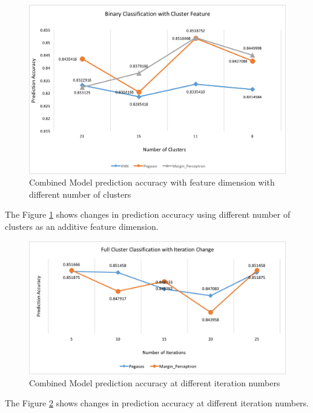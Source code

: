 \documentclass[11pt,letterpaper]{article}
\begin{document}
\begin{figure}
  \includegraphics[width=\linewidth]{5_binary_classificatoin_with_clusdter_feature.png}
  \caption{Combined Model prediction accuracy with feature dimension with different number of clusters}
  \label{fig:graph5}
\end{figure}

The Figure \ref{fig:graph5} shows changes in prediction accuracy using different number of clusters as an additive feature dimension.

\begin{figure}
  \includegraphics[width=\linewidth]{6_full_iteration_change.png}
  \caption{Combined Model prediction accuracy at different iteration numbers}
  \label{fig:graph6}
\end{figure}

The Figure \ref{fig:graph6} shows changes in prediction accuracy at different iteration numbers.
\end{document}
